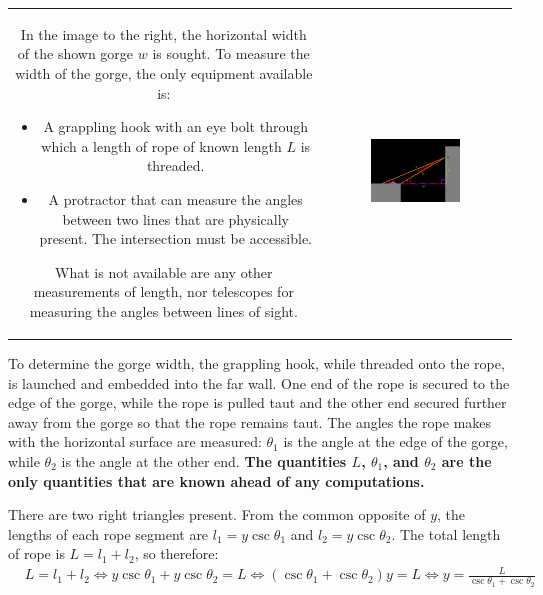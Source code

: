 \documentclass{article}
\begin{document}
\begin{tabular}{cc}
\parbox{0.5\textwidth}{
In the image to the right, the horizontal width of the shown gorge \(w\) is sought. To measure the width of the gorge, the only equipment available is: 
\begin{itemize}
\item A grappling hook with an eye bolt through which a length of rope of known length \(L\) is threaded. 
\item A protractor that can measure the angles between two lines that are physically present. The intersection must be accessible. 
\end{itemize}
What is not available are any other measurements of length, nor telescopes for measuring the angles between lines of sight.
} & \parbox{0.5\textwidth}{
\includegraphics[width = 0.5\textwidth]{gorge_width_2}
}
\end{tabular}

To determine the gorge width, the grappling hook, while threaded onto the rope, is launched and embedded into the far wall. One end of the rope is secured to the edge of the gorge, while the rope is pulled taut and the other end secured further away from the gorge so that the rope remains taut. The angles the rope makes with the horizontal surface are measured: \(\theta_1\) is the angle at the edge of the gorge, while \(\theta_2\) is the angle at the other end. {\bf The quantities \(L\), \(\theta_1\), and \(\theta_2\) are the only quantities that are known ahead of any computations.}

There are two right triangles present. From the common opposite of \(y\), the lengths of each rope segment are \(l_1 = y\csc\theta_1\) and \(l_2 = y\csc\theta_2\). The total length of rope is \(L = l_1 + l_2\), so therefore:
\begin{align*}
& L = l_1 + l_2 
\iff y\csc\theta_1 + y\csc\theta_2 = L 
\iff (\csc\theta_1 + \csc\theta_2)y = L 
\iff y = \frac{L}{\csc\theta_1 + \csc\theta_2}
\end{align*}
\end{document}

